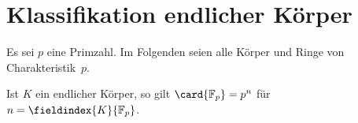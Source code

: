 \section{Klassifikation endlicher Körper}

Es sei $p$ eine Primzahl.
Im Folgenden seien alle Körper und Ringe von Charakteristik~$p$.

\begin{lemma}
  Ist $K$ ein endlicher Körper, so gilt $\card{\Finite_p} = p^n$ für $n = \fieldindex{K}{\Finite_p}$.
\end{lemma}

% 
% 














